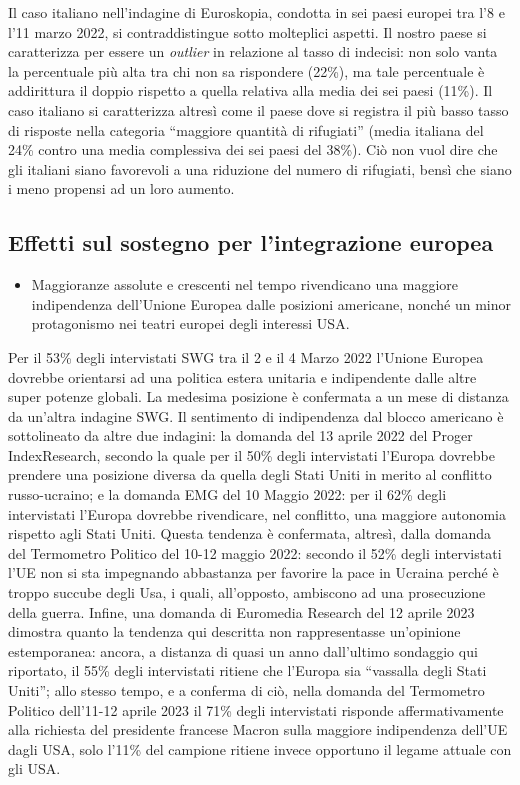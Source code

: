 \documentclass[
  openany]{book}
\providecommand{\tightlist}{%
  \setlength{\itemsep}{0pt}\setlength{\parskip}{0pt}}
\begin{document}
Il caso italiano nell'indagine di Euroskopia, condotta in sei paesi europei tra l'8 e l'11 marzo 2022, si contraddistingue sotto molteplici aspetti. Il nostro paese si caratterizza per essere un \emph{outlier} in relazione al tasso di indecisi: non solo vanta la percentuale più alta tra chi non sa rispondere (22\%), ma tale percentuale è addirittura il doppio rispetto a quella relativa alla media dei sei paesi (11\%).
Il caso italiano si caratterizza altresì come il paese dove si registra il più basso tasso di risposte nella categoria ``maggiore quantità di rifugiati'' (media italiana del 24\% contro una media complessiva dei sei paesi del 38\%). Ciò non vuol dire che gli italiani siano favorevoli a una riduzione del numero di rifugiati, bensì che siano i meno propensi ad un loro aumento.

\hypertarget{effetti-sul-sostegno-per-lintegrazione-europea}{%
\subsection{Effetti sul sostegno per l'integrazione europea}\label{effetti-sul-sostegno-per-lintegrazione-europea}}

\begin{itemize}
\tightlist
\item
  Maggioranze assolute e crescenti nel tempo rivendicano una maggiore indipendenza dell'Unione Europea dalle posizioni americane, nonché un minor protagonismo nei teatri europei degli interessi USA.
\end{itemize}

Per il 53\% degli intervistati SWG tra il 2 e il 4 Marzo 2022 l'Unione Europea dovrebbe orientarsi ad una politica estera unitaria e indipendente dalle altre super potenze globali. La medesima posizione è confermata a un mese di distanza da un'altra indagine SWG. Il sentimento di indipendenza dal blocco americano è sottolineato da altre due indagini: la domanda del 13 aprile 2022 del Proger IndexResearch, secondo la quale per il 50\% degli intervistati l'Europa dovrebbe prendere una posizione diversa da quella degli Stati Uniti in merito al conflitto russo-ucraino; e la domanda EMG del 10 Maggio 2022: per il 62\% degli intervistati l'Europa dovrebbe rivendicare, nel conflitto, una maggiore autonomia rispetto agli Stati Uniti. Questa tendenza è confermata, altresì, dalla domanda del Termometro Politico del 10-12 maggio 2022: secondo il 52\% degli intervistati l'UE non si sta impegnando abbastanza per favorire la pace in Ucraina perché è troppo succube degli Usa, i quali, all'opposto, ambiscono ad una prosecuzione della guerra. Infine, una domanda di Euromedia Research del 12 aprile 2023 dimostra quanto la tendenza qui descritta non rappresentasse un'opinione estemporanea: ancora, a distanza di quasi un anno dall'ultimo sondaggio qui riportato, il 55\% degli intervistati ritiene che l'Europa sia ``vassalla degli Stati Uniti''; allo stesso tempo, e a conferma di ciò, nella domanda del Termometro Politico dell'11-12 aprile 2023 il 71\% degli intervistati risponde affermativamente alla richiesta del presidente francese Macron sulla maggiore indipendenza dell'UE dagli USA, solo l'11\% del campione ritiene invece opportuno il legame attuale con gli USA.
\end{document}
